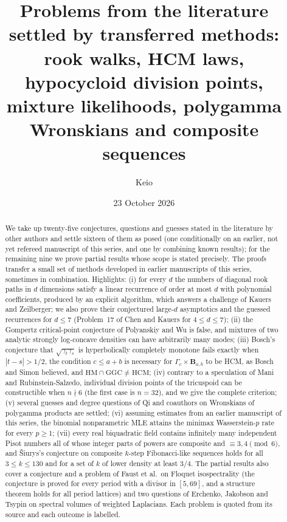 \documentclass[11pt]{amsart}
\theoremstyle{definition}
\theoremstyle{remark}
\begin{document}
\title[Problems from the literature]{Problems from the literature settled by transferred methods:\\
rook walks, HCM laws, hypocycloid division points,\\
mixture likelihoods, polygamma Wronskians and composite sequences}
\author{Keio}
\date{23 October 2026}

\begin{abstract}
We take up twenty-five conjectures, questions and guesses stated in the
literature by other authors and settle sixteen of them as posed (one
conditionally on an earlier, not yet refereed manuscript of this series,
and one by combining known results); for the remaining nine we prove
partial results whose scope is stated precisely.
The proofs transfer a small set of methods developed in earlier
manuscripts of this series, sometimes in combination. Highlights:
(i) for every $d$ the numbers of diagonal rook paths in $d$ dimensions
satisfy a linear recurrence of order at most $d$ with polynomial
coefficients, produced by an explicit algorithm, which answers a challenge
of Kauers and Zeilberger; we also prove their conjectured large-$d$
asymptotics and the guessed recurrences for $d\le7$ (Problem~17 of Chen and
Kauers for $4\le d\le7$);
(ii) the Gompertz critical-point conjecture of Polyanskiy and Wu is false,
and mixtures of two analytic strongly log-concave densities can have
arbitrarily many modes;
(iii) Bosch's conjecture that $\sqrt{\gamma_t\gamma_s}$ is hyperbolically
completely monotone fails exactly when $|t-s|>1/2$, the condition
$c\le a+b$ is necessary for $\Gamma_c\times\mathbf B_{a,b}$ to be HCM, as
Bosch and Simon believed, and $\mathrm{HM}\cap\mathrm{GGC}\ne\mathrm{HCM}$;
(iv) contrary to a speculation of Mani and Rubinstein-Salzedo, individual
division points of the tricuspoid can be constructible when $n\nmid6$ (the
first case is $n=32$), and we give the complete criterion;
(v) several guesses and degree questions of Qi and coauthors on
Wronskians of polygamma products are settled;
(vi) assuming estimates from an earlier manuscript of this series, the
binomial nonparametric MLE attains the minimax Wasserstein-$p$ rate for
every $p\ge1$;
(vii) every real biquadratic field contains infinitely many independent
Pisot numbers all of whose integer parts of powers are composite and
$\equiv3,4\pmod 6$, and Šiurys's conjecture on composite $k$-step
Fibonacci-like sequences holds for all $3\le k\le130$ and for a set of
$k$ of lower density at least $3/4$.
The partial results also cover a conjecture and a problem of Faust et al.\
on Floquet isospectrality (the conjecture is proved for every period with a
divisor in $[5,69]$, and a structure theorem holds for all period lattices)
and two questions of Erchenko, Jakobson and Tsypin on spectral volumes of
weighted Laplacians. Each problem is quoted from
its source and each outcome is labelled.
\end{abstract}
\end{document}
